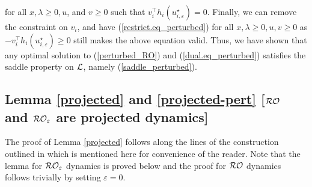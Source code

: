 \documentclass[journal,twoside,web]{ieeecolor}
\begin{document}
for all $x,\lambda\geq 0,u$, and $v\geq 0$ such that $v_i^\top h_i(u_{i,\varepsilon}^\star)=0$\;. Finally, we can remove the constraint on $v_i$, 
and have (\ref{restrict.eq_perturbed}) for all $x,\lambda\geq 0,u,v\geq 0$ as $-v_i^\top h_i(u_{i,\varepsilon}^\star)\geq 0$ still makes the above equation valid. Thus, we have shown that any optimal solution to (\ref{perturbed_RO}) and (\ref{dual.eq_perturbed}) satisfies the saddle property on ${\cal L}$, namely (\ref{saddle_perturbed}).
\fi

\iffalse
\subsection{Lemma \ref{projected} and \ref{projected-pert} [${\cal RO}$ and ${\cal RO}_\varepsilon$ are projected dynamics]}
The proof of Lemma \ref{projected} follows along the lines of the construction outlined in \cite{cherukuri2016} which is mentioned here for convenience of the reader. Note that the lemma for ${\cal RO}_\varepsilon$ dynamics is proved below and the proof for ${\cal RO}$ dynamics follows trivially by setting $\varepsilon=0$\;.
\end{document}
